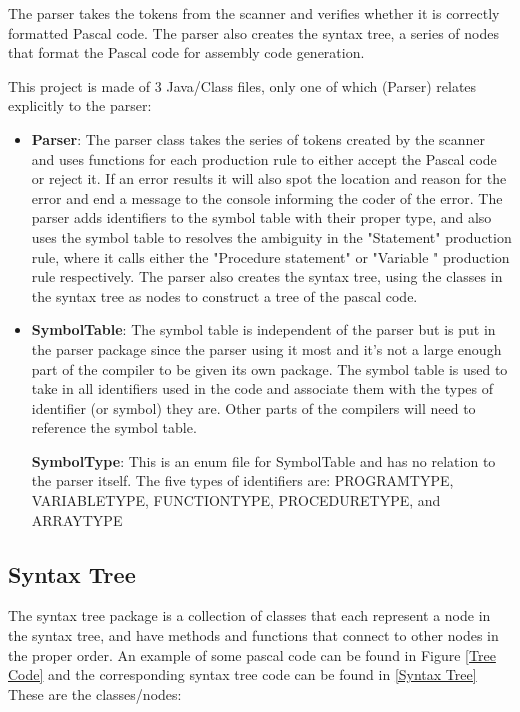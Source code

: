 \documentclass[english]{article}
\begin{document}
The parser takes the tokens from the scanner and verifies whether it is correctly formatted Pascal code. The parser also creates the syntax tree, a series of nodes that format the Pascal code for assembly code generation.

This project is made of 3 Java/Class files, only one of which (Parser) relates explicitly to the parser:

\begin{itemize}

\item
\textbf{Parser}: The parser class takes the series of tokens created by the scanner and uses functions for each production rule to either accept the Pascal code or reject it. If an error results it will also spot the location and reason for the error and end a message to the console informing the coder of the error. The parser adds identifiers to the symbol table with their proper type, and also uses the symbol table to resolves the ambiguity in the "Statement" production rule, where it calls either the "Procedure statement" or "Variable " production rule respectively. The parser also creates the syntax tree, using the classes in the syntax tree as nodes to construct a tree of the pascal code.

\item
\textbf{SymbolTable}: The symbol table is independent of the parser but is put in the parser package since the parser using it most and it’s not a large enough part of the compiler to be given its own package. The symbol table is used to take in all identifiers used in the code and associate them with the types of identifier (or symbol) they are. Other parts of the compilers will need to reference the symbol table.

\textbf{SymbolType}: This is an enum file for SymbolTable and has no relation to the parser itself. The five types of identifiers are: PROGRAMTYPE, VARIABLETYPE, FUNCTIONTYPE, PROCEDURETYPE, and ARRAYTYPE

\end{itemize}


\subsection{Syntax Tree}

The syntax tree package is a collection of classes that each represent a node in the syntax tree, and have methods and functions that connect to other nodes in the proper order. An example of some pascal code can be found in Figure \ref{Tree Code} and the corresponding syntax tree code can be found in \ref{Syntax Tree} These are the classes/nodes:
\end{document}
